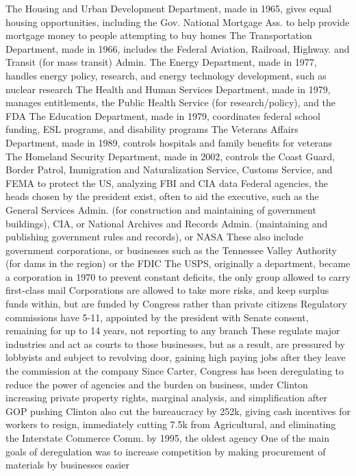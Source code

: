 \documentclass[11 pt, twoside]{article}
\newenvironment{outline*}
{
	\begin{outline}[enumerate]
	}
	{\end{outline}
}
\begin{document}
\begin{outline*}
\2 The Housing and Urban Development Department, made in 1965, gives equal housing opportunities, including the Gov. National Mortgage Ass. to help provide mortgage money to people attempting to buy homes
\2 The Transportation Department, made in 1966, includes the Federal Aviation, Railroad, Highway. and Transit (for mass transit) Admin.
\2 The Energy Department, made in 1977, handles energy policy, research, and energy technology development, such as nuclear research
\2 The Health and Human Services Department, made in 1979, manages entitlements, the Public Health Service (for research/policy), and the FDA
\2 The Education Department, made in 1979, coordinates federal school funding, ESL programs, and disability programs
\2 The Veterans Affairs Department, made in 1989, controls hospitals and family benefits for veterans
\2 The Homeland Security Department, made in 2002, controls the Coast Guard, Border Patrol, Immigration and Naturalization Service, Customs Service, and FEMA to protect the US, analyzing FBI and CIA data
\1 Federal agencies, the heads chosen by the president exist, often to aid the executive, such as the General Services Admin. (for construction and maintaining of government buildings), CIA, or National Archives and Records Admin. (maintaining and publishing government rules and records), or NASA
\2 These also include government corporations, or businesses such as the Tennessee Valley Authority (for dams in the region) or the FDIC
\2 The USPS, originally a department, became a corporation in 1970 to prevent constant deficits, the only group allowed to carry first-class mail
\2 Corporations are allowed to take more risks, and keep surplus funds within, but are funded by Congress rather than private citizens
\1 Regulatory commissions have 5-11, appointed by the president with Senate consent, remaining for up to 14 years, not reporting to any branch
\2 These regulate major industries and act as courts to those businesses, but as a result, are pressured by lobbyists and subject to revolving door, gaining high paying jobs after they leave the commission at the company
\2 Since Carter, Congress has been deregulating to reduce the power of agencies and the burden on business, under Clinton increasing private property rights, marginal analysis, and simplification after GOP pushing
\2 Clinton also cut the bureaucracy by 252k, giving cash incentives for workers to resign, immediately cutting 7.5k from Agricultural, and eliminating the Interstate Commerce Comm. by 1995, the oldest agency
\2 One of the main goals of deregulation was to increase competition by making procurement of materials by businesses easier
\end{outline*}
\end{document}
